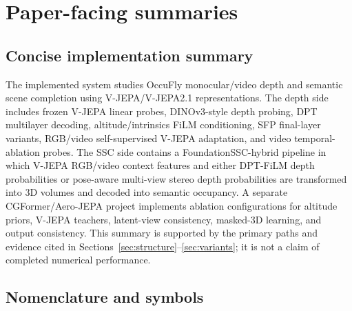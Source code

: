 \documentclass[11pt]{article}
\begin{document}
\section{Paper-facing summaries}
\label{sec:paper}

\subsection{Concise implementation summary}

The implemented system studies OccuFly monocular/video depth and semantic scene completion using V-JEPA/V-JEPA2.1 representations.  The depth side includes frozen V-JEPA linear probes, DINOv3-style depth probing, DPT multilayer decoding, altitude/intrinsics FiLM conditioning, SFP final-layer variants, RGB/video self-supervised V-JEPA adaptation, and video temporal-ablation probes.  The SSC side contains a FoundationSSC-hybrid pipeline in which V-JEPA RGB/video context features and either DPT-FiLM depth probabilities or pose-aware multi-view stereo depth probabilities are transformed into 3D volumes and decoded into semantic occupancy.  A separate CGFormer/Aero-JEPA project implements ablation configurations for altitude priors, V-JEPA teachers, latent-view consistency, masked-3D learning, and output consistency.  This summary is supported by the primary paths and evidence cited in Sections~\ref{sec:structure}--\ref{sec:variants}; it is not a claim of completed numerical performance.

\subsection{Nomenclature and symbols}
\end{document}
